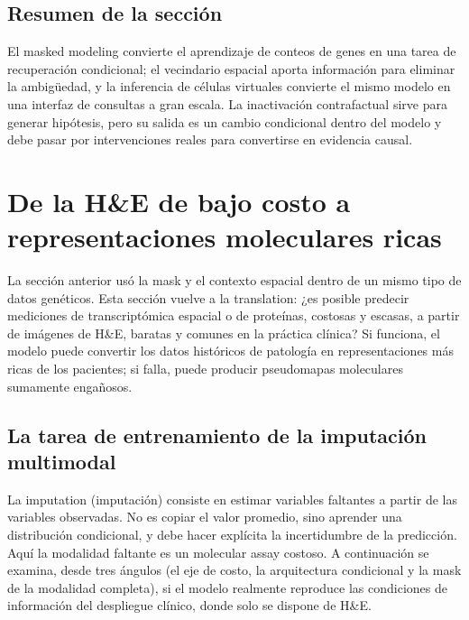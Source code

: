 \documentclass[a4paper]{article}
\begin{document}

\subsection{Resumen de la sección}

El masked modeling convierte el aprendizaje de conteos de genes en una tarea de recuperación condicional; el vecindario espacial aporta información para eliminar la ambigüedad, y la inferencia de células virtuales convierte el mismo modelo en una interfaz de consultas a gran escala. La inactivación contrafactual sirve para generar hipótesis, pero su salida es un cambio condicional dentro del modelo y debe pasar por intervenciones reales para convertirse en evidencia causal.
\section{De la H\&E de bajo costo a representaciones moleculares ricas}

La sección anterior usó la mask y el contexto espacial dentro de un mismo tipo de datos genéticos. Esta sección vuelve a la translation: ¿es posible predecir mediciones de transcriptómica espacial o de proteínas, costosas y escasas, a partir de imágenes de H\&E, baratas y comunes en la práctica clínica? Si funciona, el modelo puede convertir los datos históricos de patología en representaciones más ricas de los pacientes; si falla, puede producir pseudomapas moleculares sumamente engañosos.

\subsection{La tarea de entrenamiento de la imputación multimodal}

La imputation (imputación) consiste en estimar variables faltantes a partir de las variables observadas. No es copiar el valor promedio, sino aprender una distribución condicional, y debe hacer explícita la incertidumbre de la predicción. Aquí la modalidad faltante es un molecular assay costoso. A continuación se examina, desde tres ángulos (el eje de costo, la arquitectura condicional y la mask de la modalidad completa), si el modelo realmente reproduce las condiciones de información del despliegue clínico, donde solo se dispone de H\&E.
\end{document}
